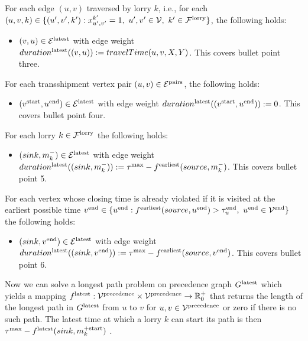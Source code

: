 For each edge $(u,v)$ traversed by lorry $k$, i.e., for each
 $(u,v,k) \in  \{ (u',v',k') : x^{k'}_{u',v'} = 1,
\ u',v' \in \mathcal V,
\ k' \in \mathcal F^{\rm lorry} \}$,
the following holds:
\begin{itemize}
  \item
  $(v,u) \in \mathcal E^{\rm latest}$
  with edge weight
  $duration^{\rm latest}((v,u)) := travelTime(u,v,X,Y)$.
  This covers bullet point three.
\end{itemize}


For each transshipment vertex pair $(u,v) \in \mathcal E^{\rm pairs}$,
the following holds:
\begin{itemize}
  \item
    $(v^{\rm start}, u^{\rm end}) \in \mathcal E^{\rm latest}$
    with edge weight
    $duration^{\rm latest}((v^{\rm start}, u^{\rm end})) := 0$.
    This covers bullet point four.
\end{itemize}

For each lorry $k \in \mathcal F^{\rm lorry} $
the following holds:
\begin{itemize}
  \item
  $( sink,m^-_k)  \in \mathcal E^{\rm latest} $
  with edge weight
    $duration^{\rm latest}(( sink,m^-_k) ) := \tau^{\rm max} - f^{\rm earliest}(source,m^-_k) $.
    This covers bullet point 5.
\end{itemize}

For each vertex whose closing time is already violated if it is visited at the earliest possible time
$ v^{\rm end} \in \{ u^{\rm end} :f^{\rm earliest}(source,u^{\rm end} ) > \tau^{\rm end}_u
, \ u^{\rm end} \in \mathcal V^{\rm end} \}$
the following holds:
\begin{itemize}
  \item
  $( sink,v^{\rm end})  \in \mathcal E^{\rm latest} $
  with edge weight
    $duration^{\rm latest}(( sink,v^{\rm end})) := \tau^{\rm max} - f^{\rm earliest}(source,v^{\rm end}) $.
    This covers bullet point 6.
\end{itemize}

Now we can solve a  longest path problem on precedence graph
$G^{\rm latest}$
which yields a mapping
$f^{\rm latest}: \mathcal V^{\rm precedence} \times \mathcal V^{\rm precedence} \rightarrow \mathbb{R}^+_0$
that returns the length of the longest path in $G^{\rm latest}$ from $u$ to $v$ for  $u,v \in \mathcal V^{\rm precedence}$ or zero if there is no such path.
The latest time at which a lorry $k$ can start its path is then $\tau^{\rm max} - f^{\rm latest}(sink,m^{+ \rm start}_k)$ . \\


